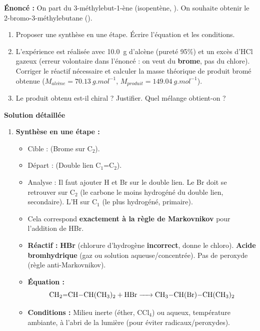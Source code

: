 \documentclass[11pt]{article}
\begin{document}
\begin{exoresolu}
\textbf{Énoncé :} On part du 3-méthylebut-1-ène (isopentène, ). On souhaite obtenir le 2-bromo-3-méthylebutane ().
\begin{enumerate}
    \item Proposer une synthèse en une étape. Écrire l'équation et les conditions.
    \item L'expérience est réalisée avec \SI{10,0}{g} d'alcène (pureté 95\%) et un excès d'HCl gazeux (erreur volontaire dans l'énoncé : on veut du \textbf{brome}, pas du chlore). Corriger le réactif nécessaire et calculer la masse théorique de produit bromé obtenue ($M_{alcène}=\SI{70,13}{g.mol^{-1}}$, $M_{produit}=\SI{149,04}{g.mol^{-1}}$).
    \item Le produit obtenu est-il chiral ? Justifier. Quel mélange obtient-on ?
\end{enumerate}

\tcblower
\textbf{Solution détaillée}

\begin{enumerate}
    \item \textbf{Synthèse en une étape :}
    \begin{itemize}
        \item Cible :  (Brome sur C$_2$).
        \item Départ :  (Double lien C$_1$=C$_2$).
        \item Analyse : Il faut ajouter H et Br sur le double lien. Le Br doit se retrouver sur C$_2$ (le carbone le moins hydrogéné du double lien, secondaire). L'H sur C$_1$ (le plus hydrogéné, primaire).
        \item Cela correspond \textbf{exactement à la règle de Markovnikov} pour l'addition de HBr.
        \item \textbf{Réactif :} \textbf{HBr} (chlorure d'hydrogène \textbf{incorrect}, donne le chloro). \textbf{Acide bromhydrique} (gaz ou solution aqueuse/concentrée). Pas de peroxyde (règle anti-Markovnikov).
        \item \textbf{Équation :}
        \[ \ce{CH2=CH-CH(CH3)2 + HBr -> CH3-CH(Br)-CH(CH3)2} \]
        \item \textbf{Conditions :} Milieu inerte (éther, CCl$_4$) ou aqueux, température ambiante, à l'abri de la lumière (pour éviter radicaux/peroxydes).
    \end{itemize}


\end{enumerate}
\end{exoresolu}
\end{document}
